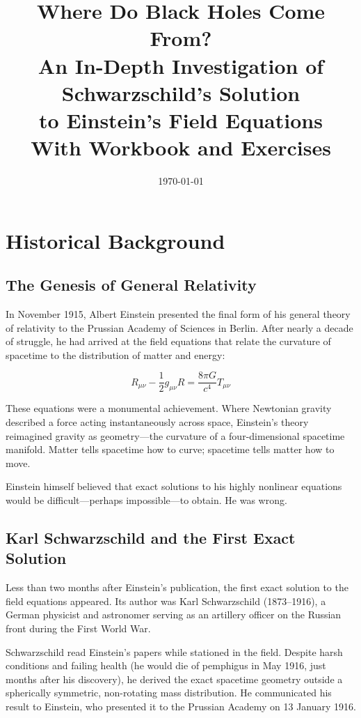 \documentclass[12pt]{article}
\title{
  \vspace{-1.5cm}
  {\huge \textbf{Where Do Black Holes Come From?}}\\[0.5em]
  {\Large An In-Depth Investigation of Schwarzschild's Solution\\[0.3em]
   to Einstein's Field Equations}\\[1em]
  {\large With Workbook and Exercises}
}
\author{}
\date{\today}
\theoremstyle{definition}
\theoremstyle{remark}
\begin{document}
\maketitle
\thispagestyle{empty}
\newpage
\tableofcontents
\newpage

\section{Historical Background}

\subsection{The Genesis of General Relativity}

In November 1915, Albert Einstein presented the final form of his general theory of relativity to the Prussian Academy of Sciences in Berlin. After nearly a decade of struggle, he had arrived at the field equations that relate the curvature of spacetime to the distribution of matter and energy:

\begin{equation}\label{eq:efe}
  R_{\mu\nu} - \frac{1}{2}g_{\mu\nu}R = \frac{8\pi G}{c^{4}} T_{\mu\nu}
\end{equation}

These equations were a monumental achievement. Where Newtonian gravity described a force acting instantaneously across space, Einstein's theory reimagined gravity as geometry---the curvature of a four-dimensional spacetime manifold. Matter tells spacetime how to curve; spacetime tells matter how to move.

Einstein himself believed that exact solutions to his highly nonlinear equations would be difficult---perhaps impossible---to obtain. He was wrong.

\subsection{Karl Schwarzschild and the First Exact Solution}

Less than two months after Einstein's publication, the first exact solution to the field equations appeared. Its author was Karl Schwarzschild (1873--1916), a German physicist and astronomer serving as an artillery officer on the Russian front during the First World War.

Schwarzschild read Einstein's papers while stationed in the field. Despite harsh conditions and failing health (he would die of pemphigus in May 1916, just months after his discovery), he derived the exact spacetime geometry outside a spherically symmetric, non-rotating mass distribution. He communicated his result to Einstein, who presented it to the Prussian Academy on 13 January 1916.
\end{document}
